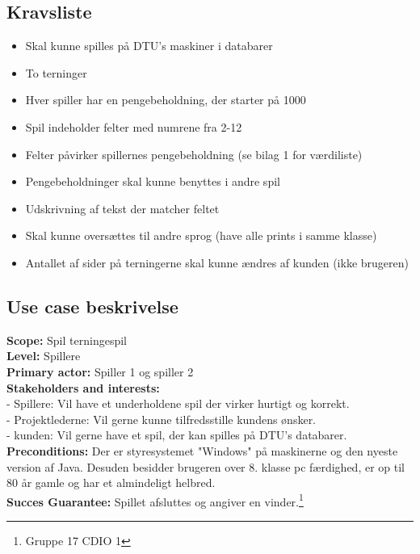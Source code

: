 \documentclass{article}
\begin{document}
\subsection{Kravsliste}
\begin{itemize}
    \item Skal kunne spilles på DTU's maskiner i databarer
    \item To terninger
    \item Hver spiller har en pengebeholdning, der starter på 1000
    \item Spil indeholder felter med numrene fra 2-12
    \item Felter påvirker spillernes pengebeholdning (se bilag 1 for værdiliste)
    \item Pengebeholdninger skal kunne benyttes i andre spil
    \item Udskrivning af tekst der matcher feltet
    \item Skal kunne oversættes til andre sprog (have alle prints i samme klasse)
    \item Antallet af sider på terningerne skal kunne ændres af kunden (ikke brugeren)
   
    
\end{itemize}

\subsection{Use case beskrivelse }
\textbf{Scope:} Spil terningespil\\
\textbf{Level:} Spillere\\
\textbf{Primary actor:} Spiller 1 og spiller 2\\
\textbf{Stakeholders and interests:}\\
- Spillere: Vil have et underholdene spil der virker hurtigt og korrekt.\\
- Projektlederne: Vil gerne kunne tilfredsstille kundens ønsker.\\
- kunden: Vil gerne have et spil, der kan spilles på DTU's databarer.\\
\textbf{Preconditions:} Der er styresystemet "Windows" på maskinerne og den nyeste version af Java. Desuden besidder brugeren over 8. klasse pc færdighed, er op til 80 år gamle og har et almindeligt helbred.\\
\textbf{Succes Guarantee:} Spillet afsluttes og angiver en vinder.\footnote{Gruppe 17 CDIO 1}\\
\end{document}
